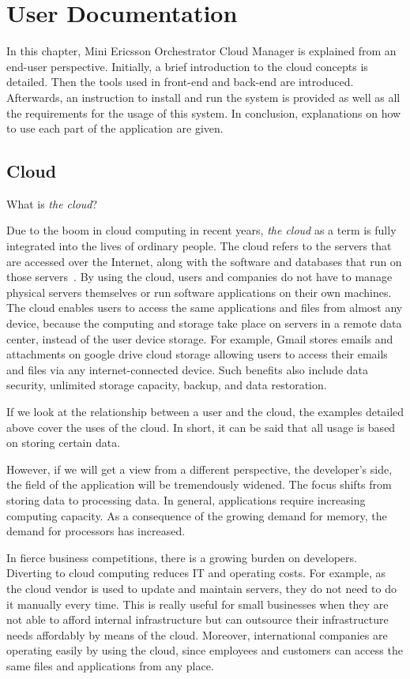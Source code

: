 \chapter{User Documentation} %
\label{ch:user}

In this chapter, Mini Ericsson Orchestrator Cloud Manager is explained from an end-user perspective. Initially, a brief introduction to the cloud concepts is detailed. Then the tools used in front-end and back-end are introduced. Afterwards, an instruction to install and run the system is provided as well as all the requirements for the usage of this system. In conclusion, explanations on how to use each part of the application are given.

\section{Cloud}
\label{sec:cloud}
What is \emph{the cloud}?

Due to the boom in cloud computing in recent years, \emph{the cloud} as a term is fully integrated into the lives of ordinary people. The cloud refers to the servers that are accessed over the Internet, along with the software and databases that run on those servers~\cite{what-is-the-cloud}. By using the cloud, users and companies do not have to manage physical servers themselves or run software applications on their own machines. The cloud enables users to access the same applications and files from almost any device, because the computing and storage take place on servers in a remote data center, instead of the user device storage. For example, Gmail stores emails and attachments on google drive cloud storage allowing users to access their emails and files via any internet-connected device. Such benefits also include data security, unlimited storage capacity, backup, and data restoration.

If we look at the relationship between a user and the cloud, the examples detailed above cover the uses of the cloud. In short, it can be said that all usage is based on storing certain data.

However, if we will get a view from a different perspective, the developer's side, the field of the application will be tremendously widened. The focus shifts from storing data to processing data. In general, applications require increasing computing capacity. As a consequence of the growing demand for memory, the demand for processors has increased.

In fierce business competitions, there is a growing burden on developers. Diverting to cloud computing reduces IT and operating costs. For example, as the cloud vendor is used to update and maintain servers, they do not need to do it manually every time. This is really useful for small businesses when they are not able to afford internal infrastructure but can outsource their infrastructure needs affordably by means of the cloud. Moreover, international companies are operating easily by using the cloud, since employees and customers can access the same files and applications from any place.


